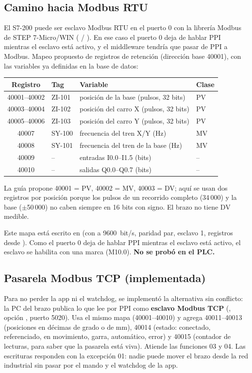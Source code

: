 \documentclass[a4paper,11pt]{article}
\begin{document}
\subsection{Camino hacia Modbus RTU}
El S7-200 puede ser esclavo Modbus RTU en el puerto 0 con la librería Modbus de STEP 7-Micro/WIN ( / ). En ese caso el puerto 0 deja de hablar PPI mientras el esclavo está activo, y el middleware tendría que pasar de PPI a Modbus. Mapeo propuesto de registros de retención (dirección base 40001), con las variables ya definidas en la base de datos:
\begin{center}\small
\begin{tabular}{c >{\ttfamily}l l l}
\toprule
\textbf{Registro} & \textrm{\textbf{Tag}} & \textbf{Variable} & \textbf{Clase}\\
\midrule
40001--40002 & ZI-101 & posición de la base (pulsos, 32 bits) & PV\\
40003--40004 & ZI-102 & posición del carro X (pulsos, 32 bits) & PV\\
40005--40006 & ZI-103 & posición del carro Y (pulsos, 32 bits) & PV\\
40007 & SY-100 & frecuencia del tren X/Y (Hz) & MV\\
40008 & SY-101 & frecuencia del tren de la base (Hz) & MV\\
40009 & -- & entradas I0.0--I1.5 (bits) & --\\
40010 & -- & salidas Q0.0--Q0.7 (bits) & --\\
\bottomrule
\end{tabular}
\end{center}
La guía propone 40001 = PV, 40002 = MV, 40003 = DV; aquí se usan dos registros por posición porque los pulsos de un recorrido completo (34\,000) y la base ($\pm$50\,000) no caben siempre en 16 bits con signo. El brazo no tiene DV medible.

Este mapa está escrito en  (con  a 9600~bit/s, paridad par, esclavo 1, registros desde ). Como el puerto 0 deja de hablar PPI mientras el esclavo está activo, el esclavo se habilita con una marca (M10.0). \textbf{No se probó en el PLC.}

\subsection{Pasarela Modbus TCP (implementada)}
Para no perder la app ni el watchdog, se implementó la alternativa sin conflicto: la PC del brazo publica lo que lee por PPI como \textbf{esclavo Modbus TCP} (, opción , puerto 5020). Usa el mismo mapa (40001--40010) y agrega 40011--40013 (posiciones en décimas de grado o de mm), 40014 (estado: conectado, referenciado, en movimiento, garra, automático, error) y 40015 (contador de lecturas, para saber que la pasarela está viva). Atiende las funciones 03 y 04. Las escrituras responden con la excepción 01: nadie puede mover el brazo desde la red industrial sin pasar por el mando y el watchdog de la app.
\end{document}
